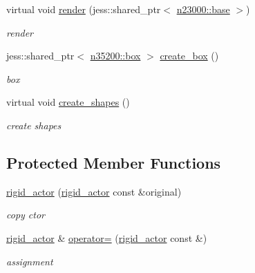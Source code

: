 \begin{DoxyCompactItemize}
virtual void \hyperlink{classnebula_1_1content_1_1actor_1_1physics_1_1rigid__actor_af9f27bb90193c5a85a3572ef15009bf7}{render} (jess::shared\_\-ptr$<$ \hyperlink{classnebula_1_1platform_1_1renderer_1_1base}{n23000::base} $>$)
\begin{DoxyCompactList}\small\item\em render \item\end{DoxyCompactList}\item 
jess::shared\_\-ptr$<$ \hyperlink{classnebula_1_1content_1_1shape_1_1physics_1_1box}{n35200::box} $>$ \hyperlink{classnebula_1_1content_1_1actor_1_1physics_1_1rigid__actor_a46198d7aa70fd4ef5410e3643104c1e2}{create\_\-box} ()
\begin{DoxyCompactList}\small\item\em box \item\end{DoxyCompactList}\item 
virtual void \hyperlink{classnebula_1_1content_1_1actor_1_1physics_1_1rigid__actor_a5ada308047050540ae655a7fe7ff8a3e}{create\_\-shapes} ()
\begin{DoxyCompactList}\small\item\em create shapes \item\end{DoxyCompactList}\end{DoxyCompactItemize}
\subsection*{Protected Member Functions}
\begin{DoxyCompactItemize}
\item 
\hyperlink{classnebula_1_1content_1_1actor_1_1physics_1_1rigid__actor_a31944793d63a691eb69596c814616dcc}{rigid\_\-actor} (\hyperlink{classnebula_1_1content_1_1actor_1_1physics_1_1rigid__actor}{rigid\_\-actor} const \&original)
\begin{DoxyCompactList}\small\item\em copy ctor \item\end{DoxyCompactList}\item 
\hyperlink{classnebula_1_1content_1_1actor_1_1physics_1_1rigid__actor}{rigid\_\-actor} \& \hyperlink{classnebula_1_1content_1_1actor_1_1physics_1_1rigid__actor_aa3d6e979793753e37b9b95b118e40c67}{operator=} (\hyperlink{classnebula_1_1content_1_1actor_1_1physics_1_1rigid__actor}{rigid\_\-actor} const \&)
\begin{DoxyCompactList}\small\item\em assignment \item\end{DoxyCompactList}\end{DoxyCompactItemize}


